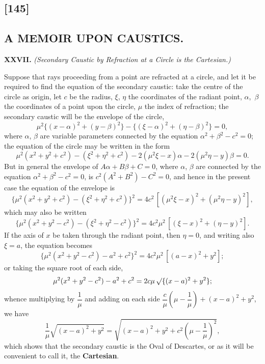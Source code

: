 \documentclass[11pt,a4paper]{book}
\begin{document}
\begin{center}
\section*{[145]}
\subsection*{A MEMOIR UPON CAUSTICS.}

\medskip\noindent\textbf{XXVII.}
\textit{(Secondary Caustic by Refraction at a Circle is the Cartesian.)}

Suppose that rays proceeding from a point are refracted at a circle,
and let it be required to find the equation of the secondary caustic:
take the centre of the circle as origin, let $c$ be the radius,
$\xi$, $\eta$ the coordinates of the radiant point, $\alpha$,~$\beta$
the coordinates of a point upon the circle, $\mu$ the index of refraction;
the secondary caustic will be the envelope of the circle,
\[
\mu^{2} \{(x - \alpha)^{2} + (y - \beta)^{2}\}
- \{(\xi - \alpha)^{2} + (\eta - \beta)^{2}\} = 0,
\]
where $\alpha$, $\beta$ are variable parameters connected by the equation
$\alpha^{2} + \beta^{2} - c^{2} = 0$;
the equation of the circle may be written in the form
\[
\mu^{2} (x^{2} + y^{2} + c^{2}) - (\xi^{2} + \eta^{2} + c^{2})
- 2(\mu^{2}\xi - x)\alpha - 2(\mu^{2}\eta - y)\beta = 0.
\]
But in general the envelope of $A\alpha + B\beta + C = 0$,
where $\alpha$, $\beta$ are connected by the equation
$\alpha^{2} + \beta^{2} - c^{2} = 0$, is
$c^{2}(A^{2} + B^{2}) - C^{2} = 0$, and hence in the present case
the equation of the envelope is
\[
\{ \mu^{2} (x^{2} + y^{2} + c^{2}) - (\xi^{2} + \eta^{2} + c^{2}) \}^{2}
= 4c^{2} \, [ (\mu^{2}\xi - x)^{2} + (\mu^{2}\eta - y)^{2} ],
\]
which may also be written
\[
\{ \mu^{2} (x^{2} + y^{2} - c^{2}) - (\xi^{2} + \eta^{2} - c^{2}) \}^{2}
= 4c^{2}\mu^{2} \, [ (\xi - x)^{2} + (\eta - y)^{2} ].
\]
If the axis of $x$ be taken through the radiant point,
then $\eta = 0$, and writing also $\xi = a$, the equation becomes
\[
\{ \mu^{2} (x^{2} + y^{2} - c^{2}) - a^{2} + c^{2} \}^{2}
= 4c^{2}\mu^{2} \, [ (a - x)^{2} + y^{2} ];
\]
or taking the square root of each side,
\[
\mu^{2} (x^{2} + y^{2} - c^{2}) - a^{2} + c^{2}
= 2c\mu \, \surd\{ (x - a)^{2} + y^{2} \};
\]
whence multiplying by $\dfrac{1}{\mu}$ and adding on each side
$\dfrac{c}{\mu} \left( \mu - \dfrac{1}{\mu} \right) + (x - a)^{2} + y^{2}$, we have
\[
\frac{1}{\mu} \sqrt{(x - a)^{2} + y^{2}}
= \sqrt{(x - a)^{2} + y^{2} + c^{2} \left( \mu - \frac{1}{\mu} \right)^{2}},
\]
which shows that the secondary caustic is the Oval of Descartes,
or as it will be convenient to call it, the \textbf{Cartesian}.


\end{center}
\end{document}
